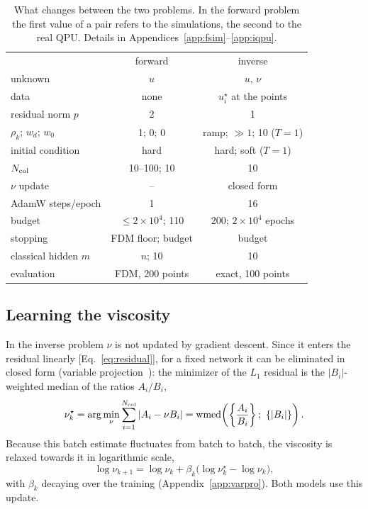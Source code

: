 \documentclass[floatfix,aps,pra,twocolumn,superscriptaddress,10pt,nofootinbib]{revtex4-2}
\newcommand{\wmed}{\operatorname{wmed}}
\newcommand{\Ncol}{N_{\rm col}}
\begin{document}
\begin{table}[t]
\caption{\justifying What changes between the two problems. In the forward problem the first value of a pair refers to the simulations, the second to the real QPU. Details in Appendices~\ref{app:fsim}--\ref{app:iqpu}.}
\label{tab:problems}
\setlength{\tabcolsep}{2pt}
\footnotesize
\begin{ruledtabular}
\begin{tabular}{lcc}
 & forward & inverse\\
\colrule
unknown & $u$ & $u$, $\nu$\\
data & none & $u^\star_i$ at the points\\
residual norm $p$ & 2 & 1\\
$\rho_k$; $w_d$; $w_0$ & 1; 0; 0 & ramp; $\gg1$; 10 ($T=1$)\\
initial condition & hard & hard; soft ($T=1$)\\
$\Ncol$ & 10--100; 10 & 10\\
$\nu$ update & -- & closed form\\
AdamW steps/epoch & 1 & 16\\
budget & $\le2{\times}10^4$; 110 & 200; $2{\times}10^4$ epochs\\
stopping & FDM floor; budget & budget\\
classical hidden $m$ & $n$; 10 & 10\\
evaluation & FDM, 200 points & exact, 100 points\\
\end{tabular}
\end{ruledtabular}
\end{table}

\subsection{Learning the viscosity}\label{sec:nu}
In the inverse problem $\nu$ is not updated by gradient descent. Since it enters the residual linearly [Eq.~\eqref{eq:residual}], for a fixed network it can be eliminated in closed form (variable projection~\cite{golub1973differentiation}): the minimizer of the $L_1$ residual is the $|B_i|$-weighted median of the ratios $A_i/B_i$,
\begin{equation}
  \nu^\star_k=\arg\min_{\nu}\sum_{i=1}^{\Ncol}|A_i-\nu B_i|=\wmed\!\left(\left\{\frac{A_i}{B_i}\right\};\ \{|B_i|\}\right).
  \label{eq:wmed}
\end{equation}
Because this batch estimate fluctuates from batch to batch, the viscosity is relaxed towards it in logarithmic scale,
\begin{equation}
  \log\nu_{k+1}=\log\nu_k+\beta_k\big(\log\nu^\star_k-\log\nu_k\big),
  \label{eq:logrelax}
\end{equation}
with $\beta_k$ decaying over the training (Appendix~\ref{app:varpro}). Both models use this update.
\end{document}
